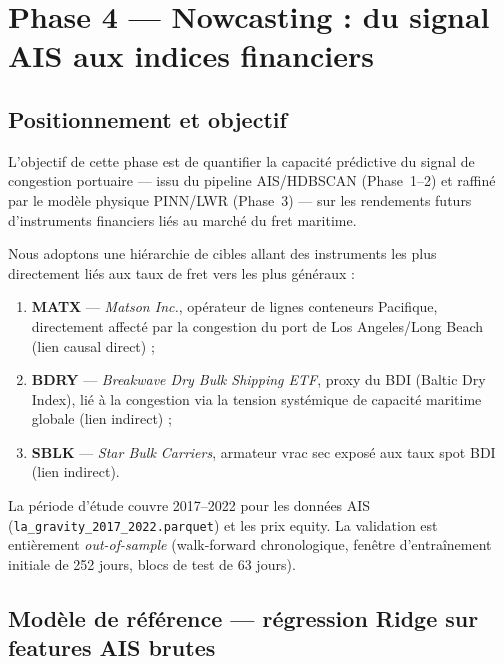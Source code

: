 
\section{Phase 4 --- Nowcasting : du signal AIS aux indices financiers}
\label{sec:phase4}

\subsection{Positionnement et objectif}

L'objectif de cette phase est de quantifier la capacité prédictive du
signal de congestion portuaire --- issu du pipeline AIS/HDBSCAN (Phase~1--2) et
raffiné par le modèle physique PINN/LWR (Phase~3) --- sur les rendements futurs
d'instruments financiers liés au marché du fret maritime.

Nous adoptons une hiérarchie de cibles allant des instruments les plus
directement liés aux taux de fret vers les plus généraux :

\begin{enumerate}
    \item \textbf{MATX} --- \textit{Matson Inc.}, opérateur de lignes
    conteneurs Pacifique, directement affecté par la congestion du port de
    Los Angeles/Long Beach (lien causal direct) ;
    \item \textbf{BDRY} --- \textit{Breakwave Dry Bulk Shipping ETF}, proxy
    du BDI (Baltic Dry Index), lié à la congestion via la tension systémique
    de capacité maritime globale (lien indirect) ;
    \item \textbf{SBLK} --- \textit{Star Bulk Carriers}, armateur vrac sec
    exposé aux taux spot BDI (lien indirect).
\end{enumerate}

\noindent
La période d'étude couvre 2017--2022 pour les données AIS
(\texttt{la\_gravity\_2017\_2022.parquet}) et les prix equity. La validation
est entièrement \emph{out-of-sample} (walk-forward chronologique, fenêtre
d'entraînement initiale de 252 jours, blocs de test de 63 jours).

\bigskip

\subsection{Modèle de référence --- régression Ridge sur features AIS brutes}
\label{sec:baseline}

